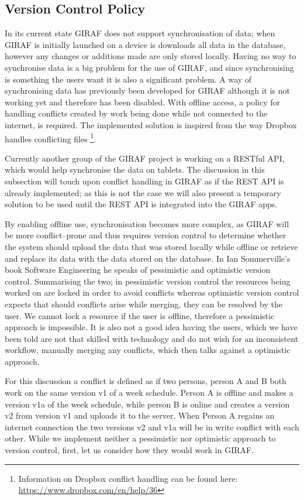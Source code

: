 \subsection{Version Control Policy}
In its current state GIRAF does not support synchronisation of data; when GIRAF is initially launched on a device is downloads all data in the database, however any changes or additions made are only stored locally.
Having no way to synchronise data is a big problem for the use of GIRAF, and since synchronising is something the users want it is also a significant problem.
A way of synchronising data has previously been developed for GIRAF although it is not working yet and therefore has been disabled.
With offline access, a policy for handling conflicts created by work being done while not connected to the internet, is required. 
The implemented solution is inspired from the way Dropbox handles conflicting files \footnote{Information on Dropbox conflict handling can be found here: \url{https://www.dropbox.com/en/help/36}}. 

\bigskip
Currently another group of the GIRAF project is working on a RESTful API, which would help synchronise the data on tablets.
The discussion in this subsection will touch upon conflict handling in GIRAF as if the REST API is already implemented; as this is not the case we will also present  a temporary solution to be used until the REST API is integrated into the GIRAF apps.

By enabling offline use, synchronisation becomes more complex, as GIRAF will be more conflict--prone and thus requires version control to determine whether the system should upload the data that was stored locally while offline or retrieve and replace its data with the data stored on the database.
In Ian Sommerville's book Software Engineering \citep{SEBOOK} he speaks of pessimistic and optimistic version control.
Summarising the two; in pessimistic version control the resources being worked on are locked in order to avoid conflicts whereas optimistic version control expects that should conflicts arise while merging, they can be resolved by the user.
We cannot lock a resource if the user is offline, therefore a pessimistic approach is impossible.
It is also not a good idea having the users, which we have been told are not that skilled with technology and do not wish for an inconsistent workflow, manually merging any conflicts, which then talks against a optimistic approach.

\bigskip 
For this discussion a conflict is defined as if two persons, person A and B both work on the same version v1 of a week schedule.
Person A is offline and makes a version v1a of the week schedule, while person B is online and creates a version v2 from version v1 and uploads it to the server.
When Person A regains an internet connection the two versions v2 and v1a will be in write conflict with each other.
While we implement neither a pessimistic nor optimistic approach to version control, first, let us consider how they would work in GIRAF. 


